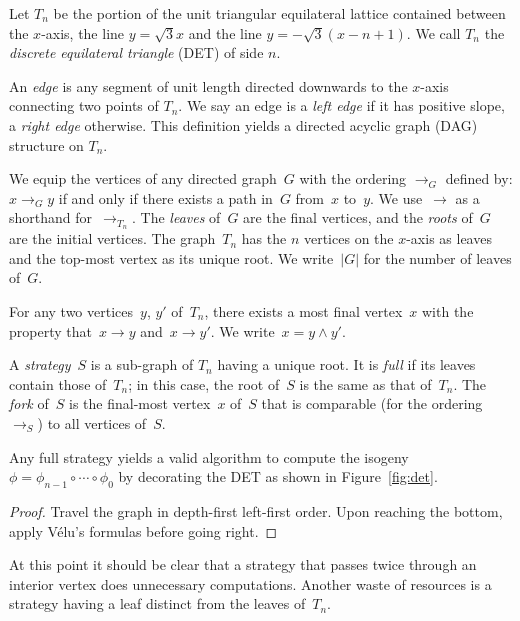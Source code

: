 \documentclass[jmc]{degruyter-journal-a}
\theoremstyle{definition}
\def\abs#1{\left|#1\right|}
\begin{document}
\def\order{\mathop{\rightarrow}}

\begin{definition}  Let $T_n$ be the portion of the unit triangular equilateral lattice
  contained between the $x$-axis, the line $y=\sqrt{3}x$ and the line
  $y=-\sqrt{3}(x-n+1)$. We call $T_n$ the \emph{discrete equilateral
    triangle} (DET) of side $n$.

  An \emph{edge} is any segment of unit length
  directed downwards to the $x$-axis connecting two points of $T_n$. We say
  an edge is a \emph{left edge} if it has positive slope, a
  \emph{right edge} otherwise. This definition yields a directed acyclic graph
  (DAG) structure on $T_n$.

  We equip the vertices of any directed graph~$G$ with the ordering
  $\order_G$ defined by: $x \order_G y$ if and only if there exists a
  path in~$G$ from~$x$ to~$y$. We use~$\order$ as a shorthand
  for~$\order_{T_n}$. The \emph{leaves} of~$G$ are the final vertices, and
  the \emph{roots} of~$G$ are the initial vertices. The graph~$T_n$ has the
  $n$ vertices on the $x$-axis as leaves and the top-most vertex as its
  unique root. We write~$\abs{G}$ for the number of leaves of~$G$.

  For any two vertices~$y$, $y'$ of~$T_n$, there exists a most final
  vertex~$x$ with the property that~$x \order y$ and~$x \order y'$. We
  write~$x = y \wedge y'$.

  A \emph{strategy}~$S$ is a sub-graph of $T_n$ having a unique root.
  It is \emph{full} if its leaves contain those of~$T_n$; in this case,
  the root of~$S$ is the same as that of~$T_n$. The \emph{fork} of~$S$ is
  the final-most vertex~$x$ of~$S$ that is comparable (for the
  ordering~$\order_S$) to all vertices of~$S$.
\end{definition}

\begin{lemma}\label{lem:strategy}
  Any full strategy yields a valid algorithm to compute the isogeny
  $\phi=\phi_{n-1}\circ\cdots\circ\phi_0$ by decorating the DET as
  shown in Figure~\ref{fig:det}.
\end{lemma}

\begin{proof}
  Travel the graph in depth-first left-first order. Upon reaching
  the bottom, apply V\'elu's formulas before going right.
\end{proof}

At this point it should be clear that a strategy that passes twice
through an interior vertex does unnecessary computations. Another waste
of resources is a strategy having a leaf distinct from the leaves
of~$T_n$.
\end{document}
